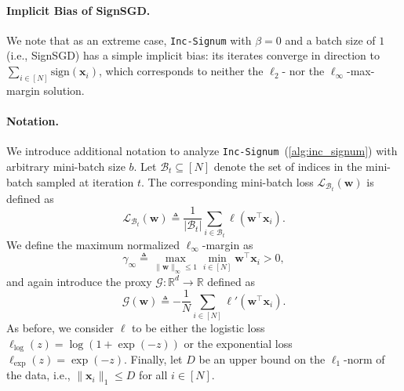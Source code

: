 \documentclass{article} %
\theoremstyle{plain}
\theoremstyle{definition}
\theoremstyle{remark}
\def\gB{{\mathcal{B}}}
\def\gG{{\mathcal{G}}}
\newcommand{\Ls}{\mathcal{L}}
\def\bx{{\mathbf x}}
\def\bw{{\mathbf w}}
\begin{document}
\paragraph{Implicit Bias of SignSGD.}
We note that as an extreme case, \texttt{Inc-Signum} with $\beta=0$ and a batch size of $1$ (i.e., SignSGD) has a simple implicit bias: its iterates converge in direction to $\sum_{i \in [N]} \mathrm{sign}(\bx_i)$, which corresponds to neither the $\ell_2$- nor the $\ell_\infty$-max-margin solution.

\paragraph{Notation.}
We introduce additional notation to analyze \texttt{Inc-Signum}~(\cref{alg:inc_signum}) with arbitrary mini-batch size $b$. Let $\gB_t \subseteq [N]$ denote the set of indices in the mini-batch sampled at iteration $t$. The corresponding mini-batch loss $\Ls_{\gB_t}(\bw)$ is defined as
\[
\Ls_{\gB_t}(\bw) \triangleq \frac{1}{|\gB_t|} \sum_{i \in \gB_t} \ell(\bw^\top \bx_i).
\]
We define the maximum normalized $\ell_\infty$-margin as
\[
\gamma_\infty \triangleq \max_{\|\bw\|_\infty \leq 1} \min_{i \in [N]} \bw^\top \bx_i > 0,
\]
and again introduce the proxy $\gG: \mathbb R^d \to \mathbb R$ defined as
\[
\gG(\bw) \triangleq -\frac{1}{N} \sum_{i \in [N]} \ell'(\bw^\top \bx_i).
\]
As before, we consider $\ell$ to be either the logistic loss $\ell_{\mathrm{log}}(z) = \log(1+\exp(-z))$ or the exponential loss $\ell_{\mathrm{exp}}(z) = \exp(-z)$. Finally, let $D$ be an upper bound on the $\ell_1$-norm of the data, i.e., $\|\bx_i\|_1 \leq D$ for all $i \in [N]$.
\end{document}
